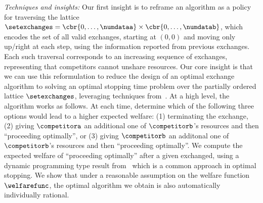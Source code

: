 \emph{Techniques and insights:}
Our first insight is to reframe an algorithm as a policy for traversing the lattice 
\(
    \setexchanges
    =
    \cbr{0,\ldots,\numdataa}
    \times
    \cbr{0,\ldots,\numdatab}
\), 
which encodes the set of all valid exchanges,
starting at $(0,0)$ and moving only up/right at each step, using the information 
reported from previous exchanges.
Each such traversal corresponds to an increasing sequence of exchanges, representing that competitors
cannot unshare resources.
Our core insight is that we can use this reformulation to reduce the design of an optimal exchange
algorithm to solving an optimal stopping time problem over the partially ordered lattice $\setexchanges$,
leveraging techniques from~\citep{mandelbaum1981optimal}.
At a high level, the algorithm works as follows. At each time, determine which of the following three options would lead to 
a higher expected welfare: (1) terminating the exchange, (2) giving $\competitora$ an additional one of 
$\competitorb$'s resources and then ``proceeding optimally'', or (3) giving $\competitorb$ an additonal one of $\competitorb$'s
resources and then ``proceeding optimally''.
We compute the expected welfare of ``proceeding optimally'' after a given exchanged, using a dynamic programming 
type result from~\citep{mandelbaum1981optimal} which is a common approach in optimal stopping.
We show that under a reasonable assumption on the welfare function $\welfarefunc$,
the optimal algorithm we obtain is also automatically individually rational.

    

